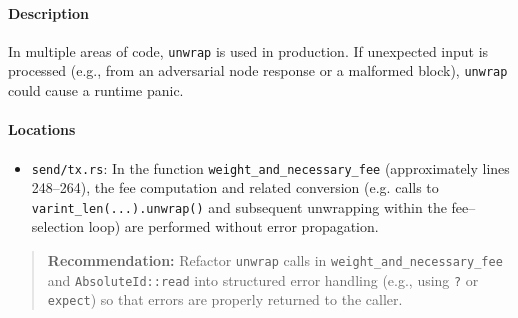 \documentclass[12pt,a4paper]{article}
\begin{document}
\paragraph{Description}
In multiple areas of code, \texttt{unwrap} is used in production. If unexpected input is processed (e.g., from an adversarial node response or a malformed block), \texttt{unwrap} could cause a runtime panic.

\paragraph{Locations}
\begin{itemize}
  \item \texttt{send/tx.rs}: In the function \texttt{weight\_and\_necessary\_fee} (approximately lines 248--264), the fee computation and related conversion (e.g. calls to \\
  \texttt{varint\_len(...).unwrap()} and subsequent unwrapping within the fee--selection loop) are performed without error propagation.
\end{itemize}

\begin{quote}
    \textbf{Recommendation:} Refactor \texttt{unwrap} calls in \texttt{weight\_and\_necessary\_fee} and \texttt{AbsoluteId::read} into structured error handling (e.g., using \texttt{?} or \texttt{expect}) so that errors are properly returned to the caller.
\end{quote}
\end{document}
